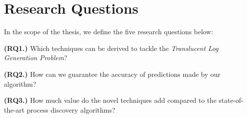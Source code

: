 \section{Research Questions}
\begin{comment}
    The research questions you pose, are questions you need to (largely) answer in order to solve the problem.
Basically, the combined set of answers to the questions you pose, allow you to solve the research problem.

From the book of Justin Zobel, \enquote{Writing for Computer Science}~\cite{DBLP:books/sp/Zobel14} (which we highly recommend you to read before writing):

\enquote{
	A hypothesis or research question should be specific and precise, and should be
	unambiguous; the more loosely a concept is defined, the more easily it will satisfy
	many needs simultaneously, even when these needs are contradictory. And it is
	important to state what is not being proposed—what the limits on the conclusions
	will be.
}

In the context of our example, we can define many relevant research questions:
\begin{enumerate}
	\item What are typical prominent noise patterns in real event data?
	\item How to detect noise patterns in event data?
	\item How to detect infrequent behavior in event data?
	\item How to detect contextually different executions of the same activity?
	\item How to balance between detected noise patterns, infrequent behavior and imprecise labels?
	\item 
\end{enumerate}
Typically, your thesis consists of 3-5 research questions (often multiple more questions can be defined).
\end{comment}

In the scope of the thesis, we define the five research questions below: 

\textbf{(RQ1.)} Which techniques can be derived to tackle the \textit{Translucent Log Generation Problem}?

\textbf{(RQ2.)} How can we guarantee the accuracy of predictions made by our algorithm?

\textbf{(RQ3.)} How much value do the novel techniques add compared to the state-of-the-art process discovery algorithms?

